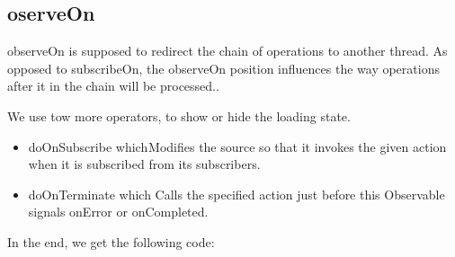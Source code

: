 \subsection{oserveOn}
observeOn is supposed to redirect the chain of operations to another thread. As opposed to subscribeOn, the observeOn position influences the way operations after it in the chain will be processed..

We use tow more operators, to show or hide the loading state. 
\begin{itemize}
	\item doOnSubscribe which Modifies the source so that it invokes the given action when it is subscribed from its subscribers.
	\item  doOnTerminate which Calls the specified action just before this Observable signals onError or onCompleted.
\end{itemize}

In the end, we get the following code:






